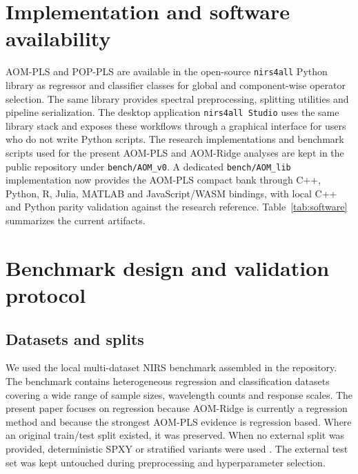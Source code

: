 \documentclass[11pt,a4paper]{article}
\begin{document}
\section{Implementation and software availability}

AOM-PLS and POP-PLS are available in the open-source \texttt{nirs4all} Python
library as regressor and classifier classes for global and component-wise
operator selection.  The same library provides spectral preprocessing,
splitting utilities and pipeline
serialization.  The desktop application \texttt{nirs4all Studio} uses the same
library stack and exposes these workflows through a graphical interface for
users who do not write Python scripts.  The research implementations and
benchmark scripts used for the present AOM-PLS and AOM-Ridge analyses are kept
in the public repository under \texttt{bench/AOM\_v0}.  A dedicated
\texttt{bench/AOM\_lib} implementation now provides the AOM-PLS compact bank
through C++, Python, R, Julia, MATLAB and JavaScript/WASM bindings, with local
C++ and Python parity validation against the research reference.
Table~\ref{tab:software} summarizes the current artifacts.

\begin{table}[t]
  \centering
  \caption{Software availability.  The production package contains the current
  AOM-PLS family; the AOM-Ridge experiments are distributed as research code in
  the benchmark directory pending API stabilization.}
  \label{tab:software}
  \small
  
\end{table}

\section{Benchmark design and validation protocol}

\subsection{Datasets and splits}

We used the local multi-dataset NIRS benchmark assembled in the repository.
The benchmark contains heterogeneous regression and classification datasets
covering a wide range of sample sizes, wavelength counts and response scales.
The present paper focuses on regression because AOM-Ridge is currently a
regression method and because the strongest AOM-PLS evidence is regression
based.  Where an original train/test split existed, it was preserved.  When no
external split was provided, deterministic SPXY or stratified variants were
used \citep{kennard1969computer,galvao2005method}.  The external test set was
kept untouched during preprocessing and hyperparameter selection.
\end{document}
